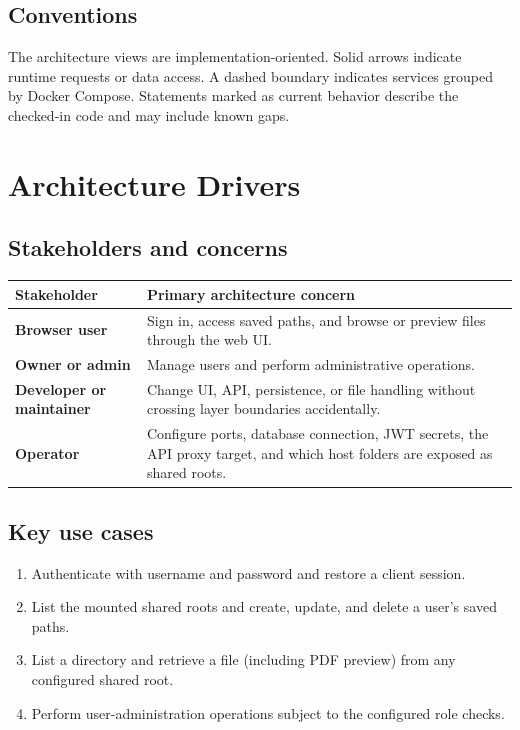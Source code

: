 \documentclass[10pt]{article}
\begin{document}
\subsection{Conventions}
The architecture views are implementation-oriented. Solid arrows indicate runtime requests or
data access. A dashed boundary indicates services grouped by Docker Compose. Statements marked
as current behavior describe the checked-in code and may include known gaps.

\section{Architecture Drivers}

\subsection{Stakeholders and concerns}
\begin{tabularx}{\linewidth}{>{\raggedright\arraybackslash\bfseries}p{4cm}X}
Stakeholder & Primary architecture concern \\
\hline
Browser user & Sign in, access saved paths, and browse or preview files through the web UI. \\
Owner or admin & Manage users and perform administrative operations. \\
Developer or maintainer & Change UI, API, persistence, or file handling without crossing layer boundaries accidentally. \\
Operator & Configure ports, database connection, JWT secrets, the API proxy target, and which host folders are exposed as shared roots. \\
\end{tabularx}

\subsection{Key use cases}
\begin{enumerate}
  \item Authenticate with username and password and restore a client session.
  \item List the mounted shared roots and create, update, and delete a user's saved paths.
  \item List a directory and retrieve a file (including PDF preview) from any configured shared root.
  \item Perform user-administration operations subject to the configured role checks.
\end{enumerate}
\end{document}
